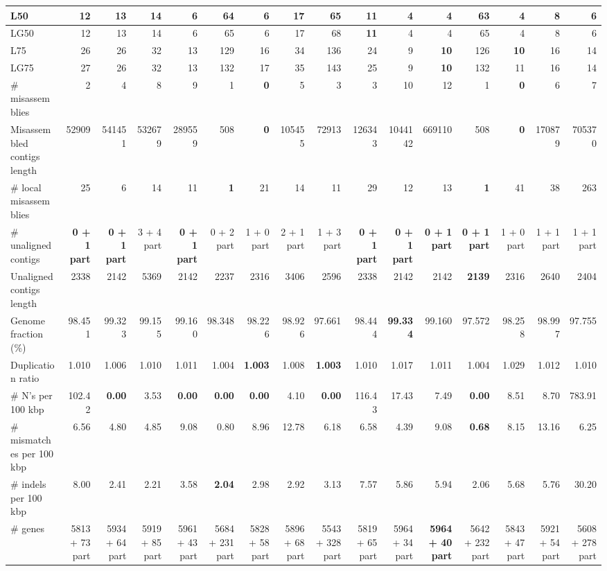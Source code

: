 \documentclass[12pt,a4paper]{article}
\begin{document}
\begin{table}[ht]
\begin{center}
\begin{tabular}{|l*{15}{|r}|}
L50 & 12 & 13 & 14 & 6 & 64 & 6 & 17 & 65 & {\bf 11} & 4 & 4 & 63 & 4 & 8 & 6 \\ \hline
LG50 & 12 & 13 & 14 & 6 & 65 & 6 & 17 & 68 & {\bf 11} & 4 & 4 & 65 & 4 & 8 & 6 \\ \hline
L75 & 26 & 26 & 32 & 13 & 129 & 16 & 34 & 136 & 24 & 9 & {\bf 10} & 126 & {\bf 10} & 16 & 14 \\ \hline
LG75 & 27 & 26 & 32 & 13 & 132 & 17 & 35 & 143 & 25 & 9 & {\bf 10} & 132 & 11 & 16 & 14 \\ \hline
\# misassemblies & 2 & 4 & 8 & 9 & 1 & {\bf 0} & 5 & 3 & 3 & 10 & 12 & 1 & {\bf 0} & 6 & 7 \\ \hline
Misassembled contigs length & 52909 & 541451 & 532679 & 289559 & 508 & {\bf 0} & 105455 & 72913 & 126343 & 1044142 & 669110 & 508 & {\bf 0} & 170879 & 705370 \\ \hline
\# local misassemblies & 25 & 6 & 14 & 11 & {\bf 1} & 21 & 14 & 11 & 29 & 12 & 13 & {\bf 1} & 41 & 38 & 263 \\ \hline
\# unaligned contigs & {\bf 0 + 1 part} & {\bf 0 + 1 part} & 3 + 4 part & {\bf 0 + 1 part} & 0 + 2 part & 1 + 0 part & 2 + 1 part & 1 + 3 part & {\bf 0 + 1 part} & {\bf 0 + 1 part} & {\bf 0 + 1 part} & {\bf 0 + 1 part} & 1 + 0 part & 1 + 1 part & 1 + 1 part \\ \hline
Unaligned contigs length & 2338 & 2142 & 5369 & 2142 & 2237 & 2316 & 3406 & 2596 & 2338 & 2142 & 2142 & {\bf 2139} & 2316 & 2640 & 2404 \\ \hline
Genome fraction (\%) & 98.451 & 99.323 & 99.155 & 99.160 & 98.348 & 98.226 & 98.926 & 97.661 & 98.444 & {\bf 99.334} & 99.160 & 97.572 & 98.258 & 98.997 & 97.755 \\ \hline
Duplication ratio & 1.010 & 1.006 & 1.010 & 1.011 & 1.004 & {\bf 1.003} & 1.008 & {\bf 1.003} & 1.010 & 1.017 & 1.011 & 1.004 & 1.029 & 1.012 & 1.010 \\ \hline
\# N's per 100 kbp & 102.42 & {\bf 0.00} & 3.53 & {\bf 0.00} & {\bf 0.00} & {\bf 0.00} & 4.10 & {\bf 0.00} & 116.43 & 17.43 & 7.49 & {\bf 0.00} & 8.51 & 8.70 & 783.91 \\ \hline
\# mismatches per 100 kbp & 6.56 & 4.80 & 4.85 & 9.08 & 0.80 & 8.96 & 12.78 & 6.18 & 6.58 & 4.39 & 9.08 & {\bf 0.68} & 8.15 & 13.16 & 6.25 \\ \hline
\# indels per 100 kbp & 8.00 & 2.41 & 2.21 & 3.58 & {\bf 2.04} & 2.98 & 2.92 & 3.13 & 7.57 & 5.86 & 5.94 & 2.06 & 5.68 & 5.76 & 30.20 \\ \hline
\# genes & 5813 + 73 part & 5934 + 64 part & 5919 + 85 part & 5961 + 43 part & 5684 + 231 part & 5828 + 58 part & 5896 + 68 part & 5543 + 328 part & 5819 + 65 part & 5964 + 34 part & {\bf 5964 + 40 part} & 5642 + 232 part & 5843 + 47 part & 5921 + 54 part & 5608 + 278 part \\ \hline

\end{tabular}
\end{center}
\end{table}
\end{document}
